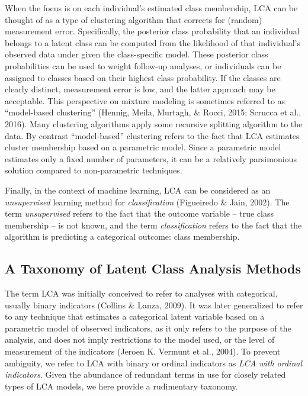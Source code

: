 \documentclass[
  ,man,floatsintext]{apa6}
\begin{document}
When the focus is on each individual's estimated class membership, LCA
can be thought of as a type of clustering algorithm that corrects for
(random) measurement error. Specifically, the posterior class
probability that an individual belongs to a latent class can be computed
from the likelihood of that individual's observed data under given the
class-specific model. These posterior class probabilities can be used to
weight follow-up analyses, or individuals can be assigned to classes
based on their highest class probability. If the classes are clearly
distinct, measurement error is low, and the latter approach may be
acceptable. This perspective on mixture modeling is sometimes referred
to as ``model-based clustering'' (Hennig, Meila, Murtagh, \& Rocci, 2015; Scrucca et al., 2016). Many clustering algorithms apply some recursive
splitting algorithm to the data. By contrast ``model-based'' clustering
refers to the fact that LCA estimates cluster membership based on a
parametric model. Since a parametric model estimates only a fixed number
of parameters, it can be a relatively parsimonious solution compared to
non-parametric techniques.

Finally, in the context of machine learning, LCA can be considered as an
\emph{unsupervised} learning method for \emph{classification}
(Figueiredo \& Jain, 2002). The term \emph{unsupervised} refers to the
fact that the outcome variable -- true class membership -- is not known,
and the term \emph{classification} refers to the fact that the algorithm is
predicting a categorical outcome: class membership.

\hypertarget{a-taxonomy-of-latent-class-analysis-methods}{%
\subsection{A Taxonomy of Latent Class Analysis Methods}\label{a-taxonomy-of-latent-class-analysis-methods}}

The term LCA was initially conceived to refer to analyses with
categorical, usually binary indicators (Collins \& Lanza, 2009). It was
later generalized to refer to any technique that estimates a categorical
latent variable based on a parametric model of observed indicators, as
it only refers to the purpose of the analysis, and does not imply
restrictions to the model used, or the level of measurement of the
indicators (Jeroen K. Vermunt et al., 2004). To prevent ambiguity, we refer to LCA
with binary or ordinal indicators as \emph{LCA with ordinal indicators}.
Given the abundance of redundant terms in use for closely related types
of LCA models, we here provide a rudimentary taxonomy.
\end{document}

